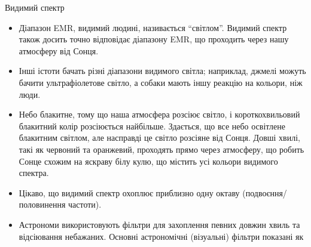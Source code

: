 {

\newlength{\nVSLength}	\setlength{\nVSLength}{0.56in}
\newlength{\nVSEnd}	\setlength{\nVSEnd}{0.001in+\nVSLength}
\newlength{\nRightSide}	\setlength{\nRightSide}{0in}
\newlength{\nLeftSide}	\setlength{\nLeftSide}{0in}

{\Large Видимий спектр \hspace{0.07in}
}
\begin{itemize}

\item Діапазон EMR, видимий людині, називається ``світлом''. Видимий спектр також досить точно відповідає діапазону EMR, що проходить через нашу атмосферу від Сонця.

\item Інші істоти бачать різні діапазони видимого світла; наприклад, джмелі можуть бачити ультрафіолетове світло, а собаки мають іншу реакцію на кольори, ніж люди.

\item Небо блакитне, тому що наша атмосфера розсіює світло, і короткохвильовий блакитний колір розсіюється найбільше. Здається, що все небо освітлене блакитним світлом, але насправді це світло розсіяне від Сонця. Довші хвилі, такі як червоний та оранжевий, проходять прямо через атмосферу, що робить Сонце схожим на яскраву білу кулю, що містить усі кольори видимого спектра.

\item Цікаво, що видимий спектр охоплює приблизно одну октаву (подвоєння/половинення частоти).

\item Астрономи використовують фільтри для захоплення певних довжин хвиль та відсіювання небажаних. Основні астрономічні (візуальні) фільтри показані як  

\end{itemize}
}
